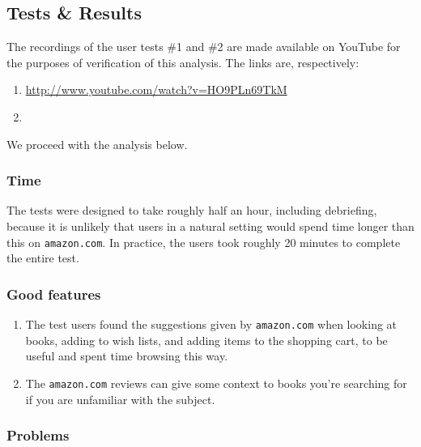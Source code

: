 \subsection{Tests \& Results}

The recordings of the user tests \#1 and \#2 are made available on YouTube for
the purposes of verification of this analysis. The links are, respectively:

\begin{enumerate}

\item \url{http://www.youtube.com/watch?v=HO9PLn69TkM}

\item 

\end{enumerate}

We proceed with the analysis below.

\subsubsection{Time}

The tests were designed to take roughly half an hour, including debriefing,
because it is unlikely that users in a natural setting would spend time longer
than this on \texttt{amazon.com}. In practice, the users took roughly 20
minutes to complete the entire test.

\subsubsection{Good features}

\begin{enumerate}

\item The test users found the suggestions given by \texttt{amazon.com} when
looking at books, adding to wish lists, and adding items to the shopping cart,
to be useful and spent time browsing this way.

\item The \texttt{amazon.com} reviews can give some context to books you're
searching for if you are unfamiliar with the subject.

\end{enumerate}

\subsubsection{Problems}

